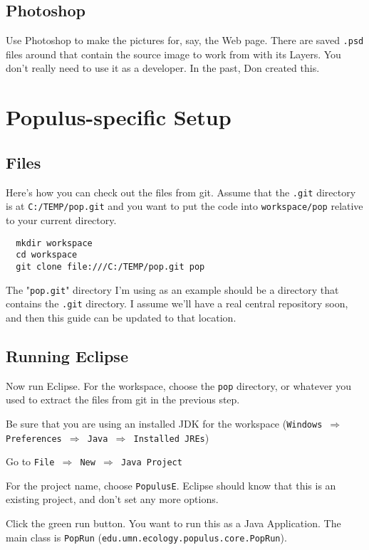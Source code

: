 \documentclass[12pt]{article}
\begin{document}
\subsection{Photoshop}
Use Photoshop to make the pictures for, say, the Web page.  There are saved \texttt{.psd} files around that contain the source image to work from with its Layers.  You don't really need to use it as a developer.  In the past, Don created this.

\section{Populus-specific Setup}
\subsection{Files}

Here's how you can check out the files from git.  Assume that the \texttt{.git} directory is at \texttt{C:/TEMP/pop.git} and you want to put the code into \texttt{workspace/pop} relative to your current directory.

\begin{verbatim}
  mkdir workspace
  cd workspace
  git clone file:///C:/TEMP/pop.git pop
\end{verbatim}

The "\texttt{pop.git}" directory I'm using as an example should be a directory that contains the \texttt{.git} directory.  I assume we'll have a real central repository soon, and then this guide can be updated to that location.

\subsection{Running Eclipse}
Now run Eclipse.  For the workspace, choose the \texttt{pop} directory, or whatever you used to extract the files from git in the previous step.

Be sure that you are using an installed JDK for the workspace (\texttt{Windows $\Rightarrow$ Preferences $\Rightarrow$ Java $\Rightarrow$ Installed JREs})

Go to \texttt{File $\Rightarrow$ New $\Rightarrow$ Java Project}


For the project name, choose \texttt{PopulusE}.  Eclipse should know that this is an existing project, and don't set any more options.

Click the green run button.  You want to run this as a Java Application.  The main class is \texttt{PopRun} (\texttt{edu.umn.ecology.populus.core.PopRun}).
\end{document}
